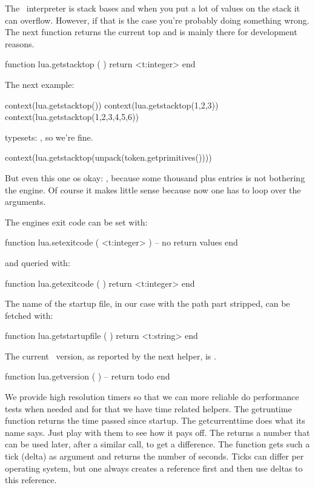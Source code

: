 The \LUA\ interpreter is stack bases and when you put a lot of values on the stack
it can overflow. However, if that is the case you're probably doing something wrong.
The next function returns the current top and is mainly there for development reasons.

\starttyping[option=LUA]
function lua.getstacktop ( )
    return <t:integer>
end
\stoptyping

The next example:

\startbuffer
\startluacode
context(lua.getstacktop())
context(lua.getstacktop(1,2,3))
context(lua.getstacktop(1,2,3,4,5,6))
\stopluacode
\stopbuffer

\typebuffer

typesets: \inlinebuffer, so we're fine.

\startbuffer
\startluacode
context(lua.getstacktop(unpack(token.getprimitives())))
\stopluacode
\stopbuffer

\typebuffer

But even this one os okay: \inlinebuffer, because some thousand plus entries is not
bothering the engine. Of course it makes little sense because now one has to loop
over the arguments.


The engines exit code can be set with:

\starttyping[option=LUA]
function lua.setexitcode ( <t:integer> )
    -- no return values
end
\stoptyping

and queried with:

\starttyping[option=LUA]
function lua.getexitcode ( )
    return <t:integer>
end
\stoptyping

The name of the startup file, in our case  with the path part stripped, can be
fetched with:

\starttyping[option=LUA]
function lua.getstartupfile ( )
    return <t:string>
end
\stoptyping

The current \LUA\ version, as reported by the next helper, is .

\starttyping[option=LUA]
function lua.getversion ( )
    -- return todo
end
\stoptyping

We provide high resolution timers so that we can more reliable do performance
tests when needed and for that we have time related helpers. The \type
{getruntime} function returns the time passed since startup. The \type
{getcurrenttime} does what its name says. Just play with them to see how it pays
off. The  returns a number that can be used later, after a
similar call, to get a difference. The  function gets
such a tick (delta) as argument and returns the number of seconds. Ticks can
differ per operating system, but one always creates a reference first and then
use deltas to this reference.

